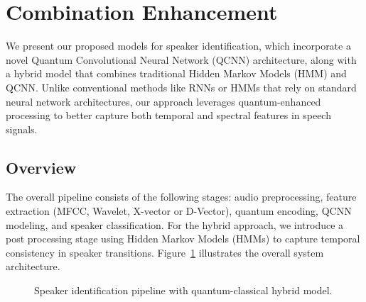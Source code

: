 \documentclass[conference]{IEEEtran}
\begin{document}
\section{Combination Enhancement}

We present our proposed models for speaker identification, which incorporate a novel Quantum Convolutional Neural Network (QCNN) architecture, along with a hybrid model that combines traditional Hidden Markov Models (HMM) and QCNN. Unlike conventional methods like RNNs or HMMs that rely on standard neural network architectures, our approach leverages quantum-enhanced processing to better capture both temporal and spectral features in speech signals.

\subsection{Overview}

The overall pipeline consists of the following stages: audio preprocessing, feature extraction (MFCC, Wavelet, X-vector or D-Vector), quantum encoding, QCNN modeling, and speaker classification. For the hybrid approach, we introduce a post processing stage using Hidden Markov Models (HMMs) to capture temporal consistency in speaker transitions. Figure~\ref{fig:pipeline} illustrates the overall system architecture.
\begin{figure}[ht]
    \centering
    \caption{Speaker identification pipeline with quantum-classical hybrid model.}
    \label{fig:pipeline}
\end{figure}
\end{document}

